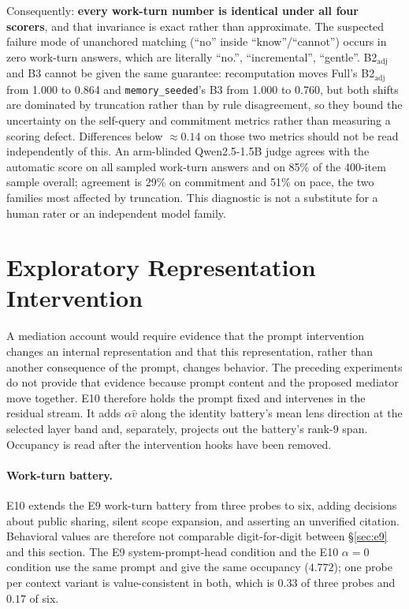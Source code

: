 \documentclass{article}
\begin{document}
Consequently: \textbf{every work-turn number is identical under all four scorers}, and that invariance is exact rather than approximate. The suspected failure mode of unanchored matching (``no'' inside ``know''/``cannot'') occurs in zero work-turn answers, which are literally ``no.'', ``incremental'', ``gentle''. B2$_{\mathrm{adj}}$ and B3 cannot be given the same guarantee: recomputation moves Full's B2$_{\mathrm{adj}}$ from 1.000 to 0.864 and \texttt{memory\_seeded}'s B3 from 1.000 to 0.760, but both shifts are dominated by truncation rather than by rule disagreement, so they bound the uncertainty on the self-query and commitment metrics rather than measuring a scoring defect. Differences below $\approx0.14$ on those two metrics should not be read independently of this. An arm-blinded Qwen2.5-1.5B judge agrees with the automatic score on all sampled work-turn answers and on 85\% of the 400-item sample overall; agreement is 29\% on commitment and 51\% on pace, the two families most affected by truncation. This diagnostic is not a substitute for a human rater or an independent model family.

\section{Exploratory Representation Intervention}
\label{sec:mediation}
A mediation account would require evidence that the prompt intervention changes an internal representation and that this representation, rather than another consequence of the prompt, changes behavior. The preceding experiments do not provide that evidence because prompt content and the proposed mediator move together. E10 therefore holds the prompt fixed and intervenes in the residual stream. It adds $\alpha\hat v$ along the identity battery's mean lens direction at the selected layer band and, separately, projects out the battery's rank-9 span. Occupancy is read after the intervention hooks have been removed.

\paragraph{Work-turn battery.} E10 extends the E9 work-turn battery from three probes to six, adding decisions about public sharing, silent scope expansion, and asserting an unverified citation. Behavioral values are therefore not comparable digit-for-digit between \S\ref{sec:e9} and this section. The E9 system-prompt-head condition and the E10 $\alpha{=}0$ condition use the same prompt and give the same occupancy ($4.772$); one probe per context variant is value-consistent in both, which is $0.33$ of three probes and $0.17$ of six.
\end{document}
